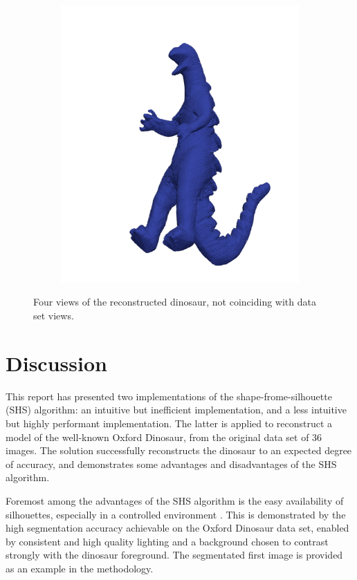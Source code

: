 \begin{figure}[ht]
\begin{subfigure}[b]{0.4\textwidth}
    \includegraphics[width=\textwidth]{images/q2_dino_view_4.png}
    \caption{}
  \end{subfigure}
  \caption{Four views of the reconstructed dinosaur, not coinciding with data set views.}
  \label{fig:dino_views}
\end{figure}

\newpage
\section{Discussion}

This report has presented two implementations of the shape-frome-silhouette (SHS) algorithm: an intuitive but inefficient implementation, and a less intuitive but highly performant implementation. The latter is applied to reconstruct a model of the well-known Oxford Dinosaur, from the original data set of 36 images. The solution successfully reconstructs the dinosaur to an expected degree of accuracy, and demonstrates some advantages and disadvantages of the SHS algorithm.

Foremost among the advantages of the SHS algorithm is the easy availability of silhouettes, especially in a controlled environment \cite{cheung_2005}. This is demonstrated by the high segmentation accuracy achievable on the Oxford Dinosaur data set, enabled by consistent and high quality lighting and a background chosen to contrast strongly with the dinosaur foreground. The segmentated first image is provided as an example in the methodology.

